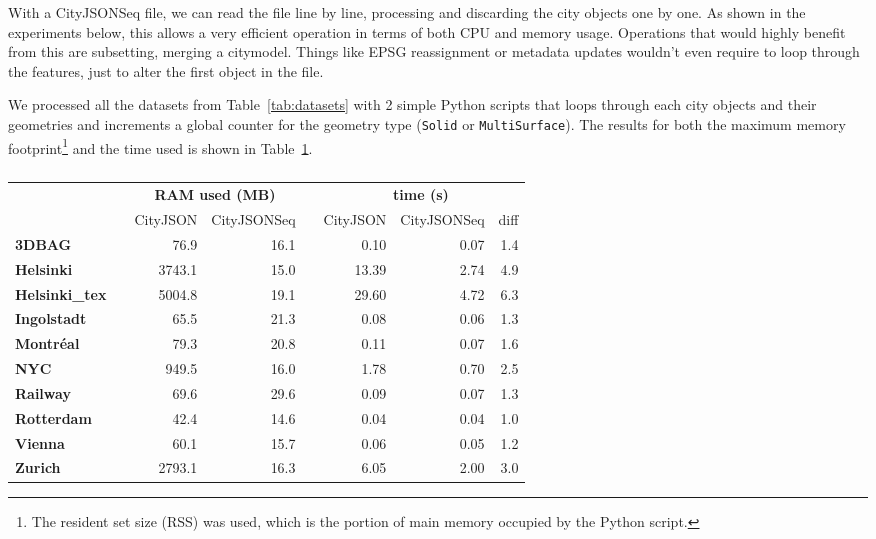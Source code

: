 \documentclass{isprs} %
\begin{document}
With a CityJSONSeq file, we can read the file line by line, processing and discarding the city objects one by one.
As shown in the experiments below, this allows a very efficient operation in terms of both CPU and memory usage.
Operations that would highly benefit from this are subsetting, merging a citymodel.
Things like EPSG reassignment or metadata updates wouldn't even require to loop through the features, just to alter the first object in the file.

We processed all the datasets from Table~\ref{tab:datasets} with 2 simple Python scripts that loops through each city objects and their geometries and increments a global counter for the geometry type (\texttt{Solid} or \texttt{MultiSurface}).
The results for both the maximum memory footprint\footnote{The resident set size (RSS) was used, which is the portion of main memory occupied by the Python script.} and the time used is shown in Table~\ref{tab:ramtime}.
\begin{table}
  \centering
  \caption{}
  \small
  \begin{tabular}
    {@{}lcrrcrrr@{}}\toprule
    &&  \multicolumn{2}{c}{\textbf{RAM used (MB)}} && \multicolumn{3}{c}{\textbf{time (s)}} \\ 
    \cmidrule{3-4} \cmidrule{6-8} 
     && CityJSON & CityJSONSeq && CityJSON & CityJSONSeq & diff \\
    \midrule
     \textbf{3DBAG}         &&   76.9 & 16.1  &&   0.10 & 0.07 & 1.4 \\
     \textbf{Helsinki}      && 3743.1 & 15.0  &&  13.39 & 2.74 & 4.9 \\
     \textbf{Helsinki\_tex} && 5004.8 & 19.1  &&  29.60 & 4.72 & 6.3 \\
     \textbf{Ingolstadt}    &&   65.5 & 21.3  &&   0.08 & 0.06 & 1.3 \\
     \textbf{Montréal}      &&   79.3 & 20.8  &&   0.11 & 0.07 & 1.6 \\
     \textbf{NYC}           &&  949.5 & 16.0  &&   1.78 & 0.70 & 2.5 \\
     \textbf{Railway}       &&   69.6 & 29.6  &&   0.09 & 0.07 & 1.3 \\
     \textbf{Rotterdam}     &&   42.4 & 14.6  &&   0.04 & 0.04 & 1.0 \\
     \textbf{Vienna}        &&   60.1 & 15.7  &&   0.06 & 0.05 & 1.2 \\
     \textbf{Zurich}        && 2793.1 & 16.3  &&   6.05 & 2.00 & 3.0 \\
    \bottomrule
  \end{tabular}%
  \label{tab:ramtime}
\end{table}
\end{document}
